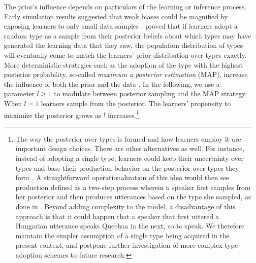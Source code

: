 \documentclass[a4paper, 11pt]{article}
\theoremstyle{Satz}
\begin{document}
The prior's influence depends on particulars of the learning or inference process. Early
simulation results suggested that weak biases could be magnified by exposing learners to only
small data samples \citep[e.g. in][]{brighton:2002}. \citet{griffiths+kalish:2007} proved that
if learners adopt a random type as a sample from their posterior beliefs about which types may
have generated the learning data that they saw, the population distribution of types will
eventually come to match the learners' prior distribution over types exactly. More
deterministic strategies such as the adoption of the type with the highest posterior
probability, so-called {\it maximum a posterior estimation} (MAP), increase the influence of
both the prior and the data \citep{griffiths+kalish:2007,kirby+etal:2007}. In the following, we
use a parameter $l\ge1$ to modulate between posterior sampling and the MAP strategy. When
$l = 1$ learners sample from the posterior. The learners' propensity to maximize the posterior
grows as $l$ increases.\footnote{The way the posterior over types is formed and how learners
  employ it are important design choices. There are other alternatives as well. For instance,
  instead of adopting a single type, learners could keep their uncertainty over types and base
  their production behavior on the posterior over types they form
  \citep{burkett+griffiths:2010}. A straightforward operationalization of this idea would then
  see production defined as a two-step process wherein a speaker first samples from her
  posterior and then produces utterances based on the type she sampled, as done in
  \citet{kirby+etal:2015}. Beyond adding complexity to the model, a disadvantage of this
  approach is that it could happen that a speaker that first uttered a Hungarian utterance
  speaks Quechua in the next, so to speak. We therefore maintain the simpler assumption of a
  single type being acquired in the present context, and postpone further investigation of more
  complex type-adoption schemes to future research.}
\end{document}
